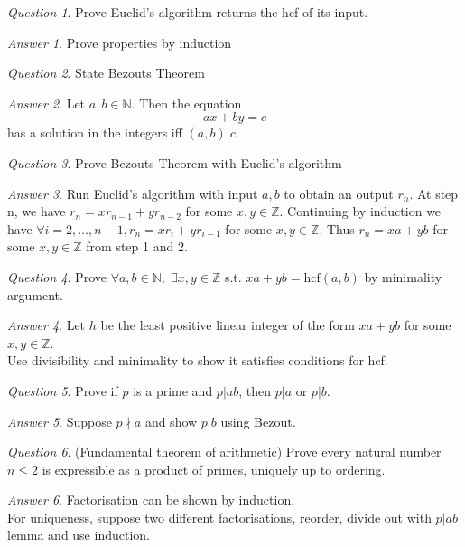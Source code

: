\documentclass[]{article}
\def\naturals{\mathbb{N}}
\def\integers{\mathbb{Z}}
\theoremstyle{remark}
\theoremstyle{qnstyle}
\newtheorem{question}{Question}
\theoremstyle{answerstyle}
\newtheorem*{answer}{Answer}
\begin{document}
\begin{question}
    Prove Euclid's algorithm returns the hcf of its input.
\end{question}
\begin{answer} 
    Prove properties by induction
\end{answer}

\begin{question}
    State Bezouts Theorem
\end{question}
\begin{answer} 
    Let $a, b \in \naturals$. Then the equation 
        $$ax + by = c$$ 
    has a solution in the integers iff $(a,b) | c$.
\end{answer}

\begin{question}
    Prove Bezouts Theorem with Euclid's algorithm
\end{question}
\begin{answer} 
    Run Euclid's algorithm with input $a,b$ to obtain an output $r_n$. At step n, we have
    $r_n = xr_{n-1} + yr_{n-2}$ for some $x, y \in \integers$. Continuing by induction 
    we have $\forall i = 2,\ldots, n-1, r_n = xr_ i+ yr_{i-1}$ for some $x,y \in \integers$.
    Thus $r_n = xa + yb$ for some $x,y \in \integers$ from step 1 and 2.
\end{answer}

\begin{question}
    Prove $\forall a,b \in \naturals,\; \exists x,y \in \integers$ s.t. $xa + yb = \text{hcf}(a,b)$ by minimality argument.
\end{question}
\begin{answer} 
    Let $h$ be the least positive linear integer of the form $xa + yb$ for some $x,y \in \integers$.\\
    Use divisibility and minimality to show it satisfies conditions for hcf.
\end{answer}

\begin{question}
    Prove if $p$ is a prime and $p | ab$, then $p|a$ or $p|b$.
\end{question}
\begin{answer} 
    Suppose $p \nmid a$ and show $p | b$ using Bezout.
\end{answer}

\begin{question}
    (Fundamental theorem of arithmetic) Prove every natural number $n \leq 2$ is
    expressible as a product of primes, uniquely up to ordering.
\end{question}
\begin{answer} 
    Factorisation can be shown by induction.\\
    For uniqueness, suppose two different factorisations, reorder, divide out with $p|ab$ lemma 
    and use induction.
\end{answer}
\end{document}
